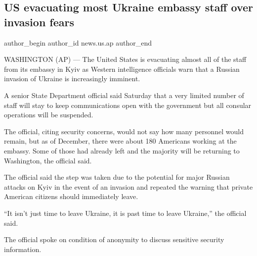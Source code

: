  
 
 
 
 
 
\subsection{US evacuating most Ukraine embassy staff over invasion fears}
\label{sec:12_02_2022.stz.news.us.ap.1.us_evacuation_ukraine}
 
\ifcmt
 author_begin
   author_id news.us.ap
 author_end
\fi

WASHINGTON (AP) — The United States is evacuating almost all of the staff from
its embassy in Kyiv as Western intelligence officials warn that a Russian
invasion of Ukraine is increasingly imminent.


A senior State Department official said Saturday that a very limited number of
staff will stay to keep communications open with the government but all
consular operations will be suspended.


The official, citing security concerns, would not say how many personnel would
remain, but as of December, there were about 180 Americans working at the
embassy. Some of those had already left and the majority will be returning to
Washington, the official said.

The official said the step was taken due to the potential for major Russian
attacks on Kyiv in the event of an invasion and repeated the warning that
private American citizens should immediately leave.

\enquote{It isn't just time to leave Ukraine, it is past time to leave
Ukraine,} the official said.

The official spoke on condition of anonymity to discuss sensitive security
information.
